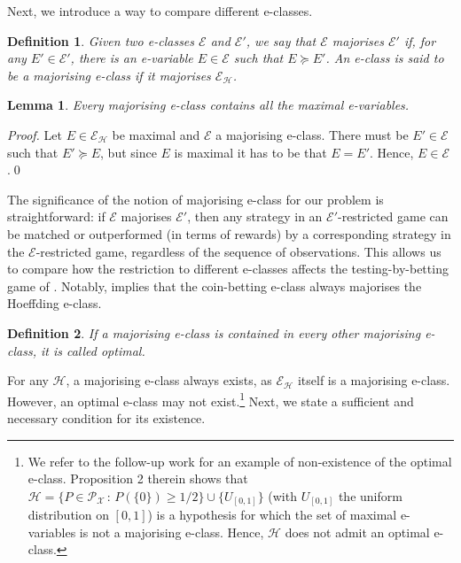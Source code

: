 \documentclass[3p, authoryear, 10pt]{elsarticle}%
\newcommand{\Ee}{\mathcal E}
\newcommand{\Hh}{\mathcal H}
\newcommand{\PR}{\mathcal P}
\newcommand{\X}{\mathcal X}
\newtheorem{definition}{Definition}
\newtheorem{lemma}{Lemma}
\begin{document}
Next, we introduce a way to compare different e-classes.
\begin{definition}
    Given two e-classes $\Ee$ and $\Ee'$, we say that $\Ee$ \emph{majorises} $\Ee'$ if, for any $E'\in\Ee'$, there is an e-variable $E\in\Ee$ such that $E\succeq E'$. An e-class is said to be a \emph{majorising} e-class if it majorises $\Ee_\Hh$. 
\end{definition}
\begin{lemma}\label{lemma:maj}
    Every majorising e-class contains all the maximal e-variables.
\end{lemma}
\begin{proof}
    Let $E\in\Ee_\Hh$ be maximal and $\Ee$ a majorising e-class. There must be $E'\in\Ee$ such that $E'\succeq E$, but since $E$ is maximal it has to be that $E=E'$. Hence, $E\in\Ee$.\qed
\end{proof}
The significance of the notion of majorising e-class for our problem is straightforward: if $\Ee$ majorises $\Ee'$, then any strategy in an $\Ee'$-restricted game can be matched or outperformed (in terms of rewards) by a corresponding strategy in the $\Ee$-restricted game, regardless of the sequence of observations. This allows us to compare how the restriction to different e-classes affects the testing-by-betting game of . Notably,  implies that the coin-betting e-class always majorises the Hoeffding e-class.

\begin{definition}
    If a majorising e-class is contained in every other majorising e-class, it is called \emph{optimal}.
\end{definition}
For any $\Hh$, a majorising e-class always exists, as $\Ee_\Hh$ itself is a majorising e-class. However, an optimal e-class may not exist.\footnote{We refer  to the follow-up work \cite{clerico24optimal} for an example of non-existence of the optimal e-class. Proposition 2 therein shows that $\Hh = \{P\in\PR_{\X}\,:\,P(\{0\})\geq 1/2\}\cup\{U_{[0,1]}\}$ (with $U_{[0,1]}$ the uniform distribution on $[0,1]$) is a hypothesis for which the set of maximal e-variables is not a majorising e-class. Hence, $\Hh$ does not admit an optimal e-class.} Next, we state a sufficient and necessary condition for its existence. 
\end{document}
